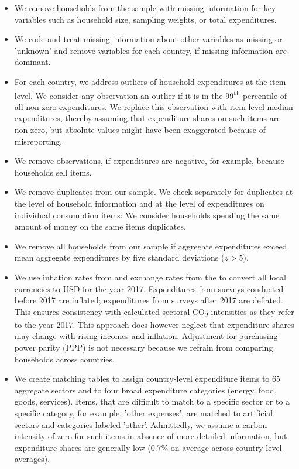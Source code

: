 \documentclass[12pt, a4paper]{article}
\begin{document}
\begin{refsection}
\begin{itemize}
    \item We remove households from the sample with missing information for key variables such as household size, sampling weights, or total expenditures.
    \item We code and treat missing information about other variables as missing or 'unknown' and remove variables for each country, if missing information are dominant.
    \item For each country, we address outliers of household expenditures at the item level. We consider any observation an outlier if it is in the 99\textsuperscript{th} percentile of all non-zero expenditures. We replace this observation with item-level median expenditures, thereby assuming that expenditure shares on such items are non-zero, but absolute values might have been exaggerated because of misreporting.
    \item We remove observations, if expenditures are negative, for example, because households sell items.
    \item We remove duplicates from our sample. We check separately for duplicates at the level of household information and at the level of expenditures on individual consumption items: We consider households spending the same amount of money on the same items duplicates.
    \item We remove all households from our sample if aggregate expenditures exceed mean aggregate expenditures by five standard deviations ($z>5$).
    \item We use inflation rates from \textcite{IMF.2020} and exchange rates from the \textcite{WorldBankGroup.2023} to convert all local currencies to USD for the year 2017. Expenditures from surveys conducted before 2017 are inflated; expenditures from surveys after 2017 are deflated. This ensures consistency with calculated sectoral CO\textsubscript{2} intensities as they refer to the year 2017. This approach does however neglect that expenditure shares may change with rising incomes and inflation. Adjustment for purchasing power parity (PPP) is not necessary because we refrain from comparing households across countries.
    \item We create matching tables to assign country-level expenditure items to 65 aggregate sectors and to four broad expenditure categories (energy, food, goods, services). Items, that are difficult to match to a specific sector or to a specific category, for example, 'other expenses', are matched to artificial sectors and categories labeled 'other'. Admittedly, we assume a carbon intensity of zero for such items in absence of more detailed information, but expenditure shares are generally low (0.7\% on average across country-level averages). 

\end{itemize}
\end{refsection}
\end{document}
